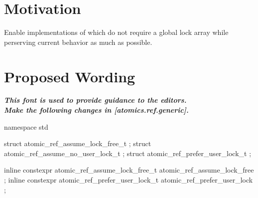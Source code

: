 \section*{Motivation}

Enable implementations of  which do not require a global lock array
while perserving current behavior as much as possible.

\section*{Proposed Wording}

\textbf{\textit{This font is used to provide guidance to the editors.}} \\

\textbf{\textit{Make the following changes in [atomics.ref.generic].}} \\

%
%

\begin{addedblock}
\begin{codeblock}
namespace std {
  struct atomic_ref_assume_lock_free_t    {};
  struct atomic_ref_assume_no_user_lock_t {};
  struct atomic_ref_prefer_user_lock_t    {};
  
  inline constexpr atomic_ref_assume_lock_free_t  atomic_ref_assume_lock_free {};
  inline constexpr atomic_ref_prefer_user_lock_t  atomic_ref_prefer_user_lock {};
}
\end{codeblock}
\end{addedblock}


